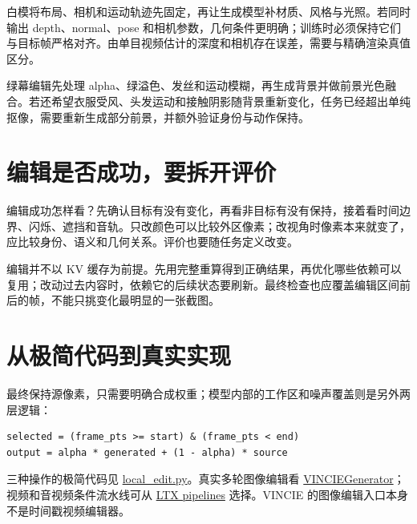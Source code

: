 白模将布局、相机和运动轨迹先固定，再让生成模型补材质、风格与光照。若同时输出 depth、normal、pose 和相机参数，几何条件更明确；训练时必须保持它们与目标帧严格对齐。由单目视频估计的深度和相机存在误差，需要与精确渲染真值区分。

绿幕编辑先处理 alpha、绿溢色、发丝和运动模糊，再生成背景并做前景光色融合。若还希望衣服受风、头发运动和接触阴影随背景重新变化，任务已经超出单纯抠像，需要重新生成部分前景，并额外验证身份与动作保持。

\section{编辑是否成功，要拆开评价}\label{seedance-m08-ux7f16ux8f91ux662fux5426ux6210ux529fux8981ux62c6ux5f00ux8bc4ux4ef7}

编辑成功怎样看？先确认目标有没有变化，再看非目标有没有保持，接着看时间边界、闪烁、遮挡和音轨。只改颜色可以比较外区像素；改视角时像素本来就变了，应比较身份、语义和几何关系。评价也要随任务定义改变。

编辑并不以 KV 缓存为前提。先用完整重算得到正确结果，再优化哪些依赖可以复用；改动过去内容时，依赖它的后续状态要刷新。最终检查也应覆盖编辑区间前后的帧，不能只挑变化最明显的一张截图。

\section{从极简代码到真实实现}\label{seedance-m08-ux4eceux6781ux7b80ux4ee3ux7801ux5230ux771fux5b9eux5b9eux73b0}

最终保持源像素，只需要明确合成权重；模型内部的工作区和噪声覆盖则是另外两层逻辑：

\begin{verbatim}
selected = (frame_pts >= start) & (frame_pts < end)
output = alpha * generated + (1 - alpha) * source
\end{verbatim}

三种操作的极简代码见 \hyperref[code-local-edit]{local\_edit.py}。真实多轮图像编辑看 \href{https://github.com/ByteDance-Seed/VINCIE/blob/97cd2c5701e694dabcfea320c0cf59893d427fab/generate.py}{VINCIEGenerator}；视频和音视频条件流水线可从 \href{https://github.com/Lightricks/LTX-2/blob/daa6b16fc7f0f1628f2c9e36a303e3312b333cc6/packages/ltx-pipelines/README.md}{LTX pipelines} 选择。VINCIE 的图像编辑入口本身不是时间戳视频编辑器。
